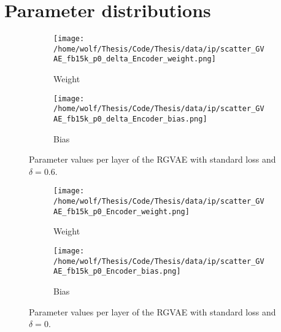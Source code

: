 \section{Parameter distributions}
\label{annexC}


\begin{figure}[H]
\centering
\begin{subfigure}{\textwidth}
    \texttt{[image: /home/wolf/Thesis/Code/Thesis/data/ip/scatter\_GVAE\_fb15k\_p0\_delta\_Encoder\_weight.png]}
    \caption{Weight}
    \label{annexC:deltaParamsW}
\end{subfigure}
\begin{subfigure}{\textwidth}
    \texttt{[image: /home/wolf/Thesis/Code/Thesis/data/ip/scatter\_GVAE\_fb15k\_p0\_delta\_Encoder\_bias.png]}
    \caption{Bias}
    \label{annexC:deltaParamsB}
\end{subfigure}
\caption{Parameter values per layer of the RGVAE with standard loss and $\delta=0.6$.}
\label{annexC:deltaParamsP0}
\end{figure}
  
  
\begin{figure}[H]
\centering
\begin{subfigure}{\textwidth}
    \texttt{[image: /home/wolf/Thesis/Code/Thesis/data/ip/scatter\_GVAE\_fb15k\_p0\_Encoder\_weight.png]}
    \caption{Weight}
    \label{annexC:normParamsW}
\end{subfigure}
\begin{subfigure}{\textwidth}
    \texttt{[image: /home/wolf/Thesis/Code/Thesis/data/ip/scatter\_GVAE\_fb15k\_p0\_Encoder\_bias.png]}
    \caption{Bias}
    \label{annexC:normParamsB}
\end{subfigure}
\caption{Parameter values per layer of the RGVAE with standard loss and $\delta=0$.}
\label{annexC:normParamsP0}
\end{figure}
  
